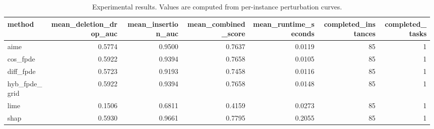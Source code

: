 \begin{table}[t]
\caption{Experimental results. Values are computed from per-instance perturbation curves.}
\label{tab:main_results_computed}
\centering
\begin{tabular}{lrrrrrr}
\toprule
method & mean\_deletion\_drop\_auc & mean\_insertion\_auc & mean\_combined\_score & mean\_runtime\_seconds & completed\_instances & completed\_tasks \\
\midrule
aime & 0.5774 & 0.9500 & 0.7637 & 0.0119 & 85 & 1 \\
cos\_fpde & 0.5922 & 0.9394 & 0.7658 & 0.0105 & 85 & 1 \\
diff\_fpde & 0.5723 & 0.9193 & 0.7458 & 0.0116 & 85 & 1 \\
hyb\_fpde\_grid & 0.5922 & 0.9394 & 0.7658 & 0.0148 & 85 & 1 \\
lime & 0.1506 & 0.6811 & 0.4159 & 0.0273 & 85 & 1 \\
shap & 0.5930 & 0.9661 & 0.7795 & 0.2055 & 85 & 1 \\
\bottomrule
\end{tabular}

\end{table}
